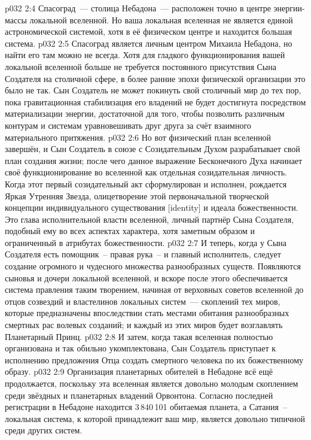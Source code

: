 \vs p032 2:4 Спасоград~--- столица Небадона~--- расположен точно в центре энергии\hyp{}массы локальной вселенной. Но ваша локальная вселенная не является единой астрономической системой, хотя в её физическом центре и находится большая система.
\vs p032 2:5 Спасоград является личным центром Михаила Небадона, но найти его там можно не всегда. Хотя для гладкого функционирования вашей локальной вселенной больше не требуется постоянного присутствия Сына Создателя на столичной сфере, в более ранние эпохи физической организации это было не так. Сын Создатель не может покинуть свой столичный мир до тех пор, пока гравитационная стабилизация его владений не будет достигнута посредством материализации энергии, достаточной для того, чтобы позволить различным контурам и системам уравновешивать друг друга за счёт взаимного материального притяжения.
\vs p032 2:6 \pc Но вот физический план вселенной завершён, и Сын Создатель в союзе с Созидательным Духом разрабатывает свой план создания жизни; после чего данное выражение Бесконечного Духа начинает своё функционирование во вселенной как отдельная созидательная личность. Когда этот первый созидательный акт сформулирован и исполнен, рождается Яркая Утренняя Звезда, олицетворение этой первоначальной творческой концепции индивидуального существования [identity] и идеала божественности. Это глава исполнительной власти вселенной, личный партнёр Сына Создателя, подобный ему во всех аспектах характера, хотя заметным образом и ограниченный в атрибутах божественности.
\vs p032 2:7 И теперь, когда у Сына Создателя есть помощник~-- правая рука~-- и главный исполнитель, следует создание огромного и чудесного множества разнообразных существ. Появляются сыновья и дочери локальной вселенной, и вскоре после этого обеспечивается система правления таким творением, начиная от верховных советов вселенной до отцов созвездий и властелинов локальных систем~--- скоплений тех миров, которые предназначены впоследствии стать местами обитания разнообразных смертных рас волевых созданий; и каждый из этих миров будет возглавлять Планетарный Принц.
\vs p032 2:8 И затем, когда такая вселенная полностью организована и так обильно укомплектована, Сын Создатель приступает к исполнению предложения Отца создать смертного человека по их божественному образу.
\vs p032 2:9 \pc Организация планетарных обителей в Небадоне всё ещё продолжается, поскольку эта вселенная является довольно молодым скоплением среди звёздных и планетарных владений Орвонтона. Согласно последней регистрации в Небадоне находится 3\,840\,101 обитаемая планета, а Сатания~-- локальная система, к которой принадлежит ваш мир, является довольно типичной среди других систем.
